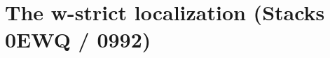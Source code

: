 \chapter{The w-strict localization (Stacks 0EWQ / 0992)}
\label{chap:Algebra_WStrictLocalization}

%
%
%
%
%

